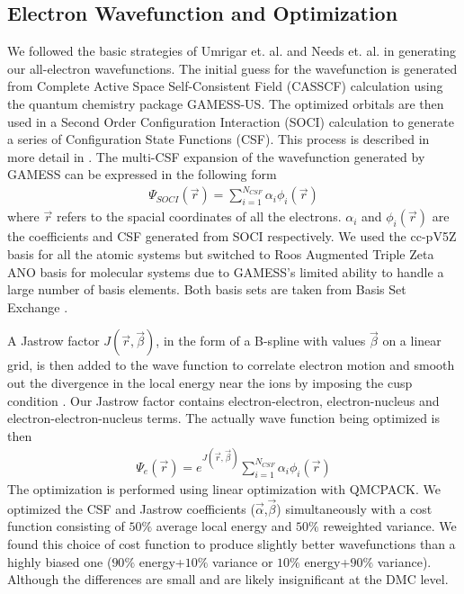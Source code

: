 \documentclass[aps,prl,superscriptaddress,groupedaddress]{revtex4}
\begin{document}
\subsection{Electron Wavefunction and Optimization}
We followed the basic strategies of Umrigar et. al.\cite{Umrigar_Alleviation,Toulouse_Bench} and Needs et. al. \cite{Brown_Bench,Seth_Bench} in generating our all-electron wavefunctions. The initial guess for the wavefunction is generated from Complete Active Space Self-Consistent Field (CASSCF) \cite{Chaban_MCSCF,Szabo} calculation using the quantum chemistry package GAMESS-US\cite{GAMESS}. The optimized orbitals are then used in a Second Order Configuration Interaction (SOCI) calculation to generate a series of Configuration State Functions (CSF). This process is described in more detail in \cite{Clark_Bench}. The multi-CSF expansion of the wavefunction generated by GAMESS can be expressed in the following form
\begin{align}
\Psi_{SOCI}(\vec{r})=\sum\limits_{i=1}^{N_{CSF}}\alpha_i\phi_i(\vec{r}) \label{eq:psi_gms}
\end{align}
where $\vec{r}$ refers to the spacial coordinates of all the electrons. $\alpha_i$ and $\phi_i(\vec{r})$ are the coefficients and CSF generated from SOCI respectively. We used the cc-pV5Z basis for all the atomic systems but switched to Roos Augmented Triple Zeta ANO basis for molecular systems due to GAMESS's limited ability to handle a large number of basis elements. Both basis sets are taken from Basis Set Exchange \cite{BSE}.

A Jastrow factor $J(\vec{r},\vec{\beta})$, in the form of a B-spline with values $\vec{\beta}$ on a linear grid, is then added to the wave function to correlate electron motion and smooth out the divergence in the local energy near the ions by imposing the cusp condition \cite{Kato}. Our Jastrow factor contains electron-electron, electron-nucleus and electron-electron-nucleus terms. The actually wave function being optimized is then
\begin{align}
\Psi_e(\vec{r})=e^{J(\vec{r},\vec{\beta})}\sum\limits_{i=1}^{N_{CSF}}\alpha_i\phi_i(\vec{r})\label{eq:psie}
\end{align}
The optimization is performed using linear optimization with QMCPACK\cite{QMCPACK}. We optimized the CSF and Jastrow coefficients ($\vec{\alpha}$,$\vec{\beta}$) simultaneously with a cost function consisting of $50\%$ average local energy and $50\%$ reweighted variance. We found this choice of cost function to produce slightly better wavefunctions than a highly biased one ($90\%$ energy+$10\%$ variance or $10\%$ energy+$90\%$ variance). Although the differences are small and are likely insignificant at the DMC level.
\end{document}
